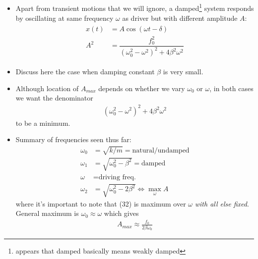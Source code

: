 \documentclass[10pt, twocolumn]{article}
\begin{document}
\newpage
\subsection{}
\begin{itemize}
	\item Apart from transient motions that we will ignore, a damped\footnote{appears that damped basically means weakly damped} system responds by oscillating at same frequency $\omega$ as driver but with different amplitude $A$:
	\begin{align}
	\tag{5.71}
	\begin{split}
		x(t) &= A \cos(\omega t - \delta) \\
		A^2 &= \dfrac{f_0^2}{(\omega_0^2 - \omega^2)^2 + 4 \beta^2 \omega^2}
	\end{split}
	\label{5.71}
	\end{align}
	\item Discuss here the case when damping constant $\beta$ is very small. 
	\item Although location of $A_{max}$ depends on whether we vary $\omega_0$ or $\omega$, in both cases we want the denominator
	\begin{align}\tag{5.72}
		(\omega_0^2 - \omega^2)^2 + 4 \beta^2 \omega^2
		\label{5.72}
	\end{align}
	to be a minimum. 
	\item Summary of frequencies seen thus far:
	\begin{align}
		\omega_0 &= \sqrt{k/m} = \text{natural/undamped} \\
		\omega_1 &= \sqrt{\omega_0^2 - \beta^2} = \text{damped} \\
		\omega &= \text{driving freq.} \\
		\omega_2 &= \sqrt{\omega_0^2 - 2 \beta^2}  \Leftrightarrow \max_\omega A
	\end{align}
	where it's important to note that (32) is maximum over $\omega$ \emph{with all else fixed}. General maximum is $\omega_0 \approx \omega$ which gives
	\begin{align}
	\tag{5.74}
		A_{max} \approx \frac{f_0}{2 \beta \omega_0}
	\label{5.74}
	\end{align}
\end{itemize}
\end{document}

